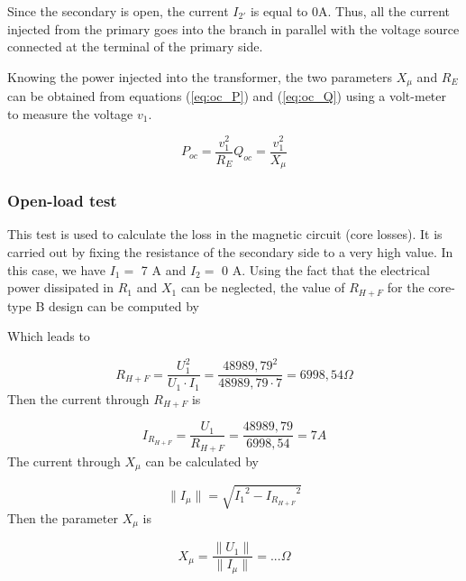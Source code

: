 \documentclass[12pt,a4paper]{report}
\begin{document}
Since the secondary is open, the current $I_{2'}$ is equal to 0A. Thus, all the current injected from the primary goes into the branch in parallel with the voltage source connected at the terminal of the primary side. 

Knowing the power injected into the transformer, the two parameters $X_\mu$ and $R_{E}$  can be obtained from equations (\ref{eq:oc_P}) and (\ref{eq:oc_Q}) using a volt-meter to measure the voltage $v_1$.

\begin{subequations}
   \begin{equation}
        P_{oc} = \frac{v_1^2}{R_{E}}\label{eq:oc_P}
   \end{equation}
   \begin{equation}
        Q_{oc} = \frac{v_1^2}{X_\mu}\label{eq:oc_Q}
   \end{equation}

\end{subequations}
\subsubsection{Open-load test}
This test is used to calculate the loss in the magnetic circuit (core losses). It is carried out by fixing the resistance of the secondary side to a very high value. In this case, we have $I_1 =$ 7 A and $I_2 =$ 0 A. Using the fact that the electrical power dissipated in $R_1$ and $X_1$ can be neglected, the value of $R_{H+F}$ for the core-type B design can be computed by



Which leads to

\begin{equation}
    R_{H+F} = \frac{U_1^2}{U_1 \cdot I_1} = \frac{48989,79^2}{48989,79 \cdot 7} = 6998,54 \Omega
\end{equation}
Then the current through $R_{H+F}$ is

\begin{equation}
    I_{R_{H+F}} = \frac{U_1}{R_{H+F}} = \frac{48989,79}{6998,54} = 7 A
\end{equation}
The current through $X_\mu$ can be calculated by 

\begin{equation}
    \|I_{\mu}\| = \sqrt{{I_1}^2 - {I_{R_{H+F}}}^2}
\end{equation}
Then the parameter $X_\mu$ is

\begin{equation}
    X_\mu = \frac{\|U_1\|}{\|I_{\mu}\|} = ... \Omega
\end{equation}
\end{document}
